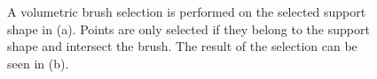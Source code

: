 \begin{figure}
\centering
{}
\caption[Example of an improved volumetric brush selection]
{A volumetric brush selection is performed on the selected support shape in (a). Points are only selected if they belong to the support shape and intersect the brush. The result of the selection can be seen in (b).}
\label{fig:technologiezentrum_brush}
\end{figure}


